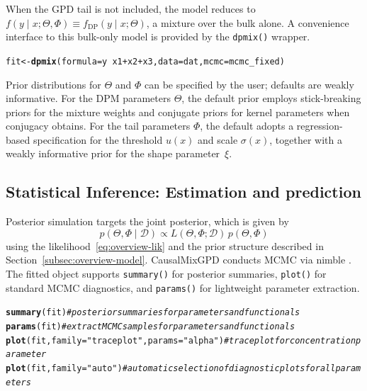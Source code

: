\documentclass[article]{jss}\usepackage[]{graphicx}\usepackage[]{xcolor}
\makeatletter
\newcommand{\hlsng}[1]{\textcolor[rgb]{0.192,0.494,0.8}{#1}}%
\newcommand{\hlcom}[1]{\textcolor[rgb]{0.678,0.584,0.686}{\textit{#1}}}%
\newcommand{\hlopt}[1]{\textcolor[rgb]{0,0,0}{#1}}%
\newcommand{\hldef}[1]{\textcolor[rgb]{0.345,0.345,0.345}{#1}}%
\newcommand{\hlkwb}[1]{\textcolor[rgb]{0.69,0.353,0.396}{#1}}%
\newcommand{\hlkwc}[1]{\textcolor[rgb]{0.333,0.667,0.333}{#1}}%
\newcommand{\hlkwd}[1]{\textcolor[rgb]{0.737,0.353,0.396}{\textbf{#1}}}%
\newenvironment{kframe}{%
 \def\at@end@of@kframe{}%
 \ifinner\ifhmode%
  \def\at@end@of@kframe{\end{minipage}}%
  \begin{minipage}{\columnwidth}%
 \fi\fi%
 \def\FrameCommand##1{\hskip\@totalleftmargin \hskip-\fboxsep
 \colorbox{shadecolor}{##1}\hskip-\fboxsep
     \hskip-\linewidth \hskip-\@totalleftmargin \hskip\columnwidth}%
 \MakeFramed {\advance\hsize-\width
   \@totalleftmargin\z@ \linewidth\hsize
   \@setminipage}}%
 {\par\unskip\endMakeFramed%
 \at@end@of@kframe}
\newenvironment{knitrout}{}{} %
\DeclareRobustCommand{\pkg}[1]{\textsf{#1}}
\DeclareRobustCommand{\code}[1]{\nolinkurl{#1}}
\makeatother
\begin{document}
When the GPD tail is not included, the model reduces to
$f(y\mid x;\Theta, \Phi) \equiv f_{\text{DP}}(y \mid x; \Theta)$, a
mixture over the bulk alone.  A convenience interface to this bulk-only
model is provided by the \code{dpmix()} wrapper.

\begin{knitrout}\footnotesize
{}\color{fgcolor}\begin{kframe}
\begin{alltt}
\hldef{fit} \hlkwb{<-} \hlkwd{dpmix}\hldef{(}\hlkwc{formula} \hldef{= y} \hlopt{~} \hldef{x1} \hlopt{+} \hldef{x2} \hlopt{+} \hldef{x3,} \hlkwc{data} \hldef{= dat,} \hlkwc{mcmc} \hldef{= mcmc_fixed)}
\end{alltt}
\end{kframe}
\end{knitrout}

Prior distributions for $\Theta$ and $\Phi$ can be specified by the
user; defaults are weakly informative.  For the DPM parameters
$\Theta$, the default prior employs stick-breaking priors for the
mixture weights and conjugate priors for kernel parameters when
conjugacy obtains.  For the tail parameters $\Phi$, the default adopts
a regression-based specification for the threshold $u(x)$ and scale
$\sigma(x)$, together with a weakly informative prior for the shape
parameter~$\xi$.

\subsection{Statistical Inference: Estimation and prediction}
\label{subsec:overview-mcmc}

Posterior simulation targets the joint posterior, which is given by
$$p(\Theta,\Phi\mid \mathcal{D}) \propto L(\Theta,\Phi;\mathcal{D})\,p(\Theta,\Phi)$$
using the likelihood~\eqref{eq:overview-lik} and the prior structure
described in Section~\ref{subsec:overview-model}.
\pkg{CausalMixGPD} conducts MCMC via \pkg{nimble}
\citep{nimble_pkg}.  The fitted object supports \code{summary()} for
posterior summaries, \code{plot()} for standard MCMC diagnostics, and
\code{params()} for lightweight parameter extraction.

\begin{knitrout}\footnotesize
{}\color{fgcolor}\begin{kframe}
\begin{alltt}
\hlkwd{summary}\hldef{(fit)}  \hlcom{# posterior summaries for parameters and functionals}
\hlkwd{params}\hldef{(fit)}   \hlcom{# extract MCMC samples for parameters and functionals}
\hlkwd{plot}\hldef{(fit,} \hlkwc{family} \hldef{=} \hlsng{"traceplot"}\hldef{,} \hlkwc{params} \hldef{=} \hlsng{"alpha"}\hldef{)} \hlcom{# traceplot for concentration parameter}
\hlkwd{plot}\hldef{(fit,} \hlkwc{family} \hldef{=} \hlsng{"auto"}\hldef{)} \hlcom{# automatic selection of diagnostic plots for all parameters}
\end{alltt}
\end{kframe}
\end{knitrout}
\end{document}
